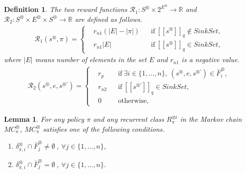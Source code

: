 \documentclass[10pt]{article}
\newtheorem{lemma}{Lemma}
\newtheorem{definition}{Definition}
\newcommand{\myspq}{\ensuremath{[\![s^{\otimes}]\!]}_q}
\newcommand{\myspdq}{\ensuremath{[\![s^{\otimes \prime}]\!]}_q}
\begin{document}
\begin{definition}
  The two reward functions $\mathcal{R}_1 : S^{\otimes} \times 2^{E^{\otimes}} \rightarrow \mathbb{R}$ and $\mathcal{R}_2 : S^{\otimes} \times E^{\otimes} \times S^{\otimes} \rightarrow \mathbb{R}$ are defined as follows.
  \begin{align}
    \mathcal{R}_1 (s^{\otimes}, \pi) =
    \left\{
    \begin{aligned}
      & r_{n1} (|E|-|\pi|) & &\text{if} \ \myspq \notin SinkSet , \\
      & r_{n1} |E| & &\text{if} \ \myspq \in SinkSet,
    \end{aligned}
    \right.
  \end{align}
  where $|E|$ means number of elements in the set $E$ and $r_{n1}$ is a negative value.
  \begin{align}
    \mathcal{R}_2(s^{\otimes}, e, s^{\otimes \prime}) =
    \left\{
    \begin{aligned}
      &r_p & & \text{if}\ \exists i \in \! \{ 1, \ldots ,n \},\ (s^{\otimes}, e, s^{\otimes \prime}) \in \bar{F}^{\otimes}_i \!,\\
      &r_{n2} & & \text{if}\ \myspdq \in SinkSet,\\
      &0 & & \text{otherwise},
    \end{aligned}
    \right.
  \end{align}
  \label{reward_def}
\end{definition}

\begin{lemma}
  For any policy $\pi$ and any recurrent class $R^{\otimes i}_{\pi}$ in the Markov chain $MC^{\otimes}_{\pi}$,
  $MC^{\otimes}_{\pi}$ satisfies one of the following conditions.
  \vspace{2mm}
  \begin{enumerate}
    \item $\delta^{\otimes}_{\pi,i} \cap \bar{F}^{\otimes}_j \neq \emptyset\ $, $ \forall j \in \{ 1, \ldots ,n \}$,
    \item $\delta^{\otimes}_{\pi,i} \cap \bar{F}^{\otimes}_j = \emptyset\ $, $ \forall j \in \{ 1, \ldots ,n \}$.
  \end{enumerate}
  \label{lemma3-1}
\end{lemma}
\end{document}
